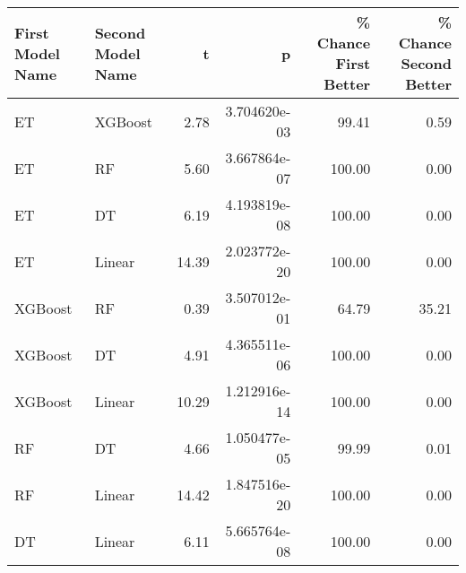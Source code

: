 \begin{tabular}{llrrrr}
\toprule
First Model Name & Second Model Name &     t &            p &  \% Chance First Better &  \% Chance Second Better \\
\midrule
              ET &           XGBoost &  2.78 & 3.704620e-03 &                  99.41 &                    0.59 \\
              ET &                RF &  5.60 & 3.667864e-07 &                 100.00 &                    0.00 \\
              ET &                DT &  6.19 & 4.193819e-08 &                 100.00 &                    0.00 \\
              ET &            Linear & 14.39 & 2.023772e-20 &                 100.00 &                    0.00 \\
         XGBoost &                RF &  0.39 & 3.507012e-01 &                  64.79 &                   35.21 \\
         XGBoost &                DT &  4.91 & 4.365511e-06 &                 100.00 &                    0.00 \\
         XGBoost &            Linear & 10.29 & 1.212916e-14 &                 100.00 &                    0.00 \\
              RF &                DT &  4.66 & 1.050477e-05 &                  99.99 &                    0.01 \\
              RF &            Linear & 14.42 & 1.847516e-20 &                 100.00 &                    0.00 \\
              DT &            Linear &  6.11 & 5.665764e-08 &                 100.00 &                    0.00 \\
\bottomrule
\end{tabular}
